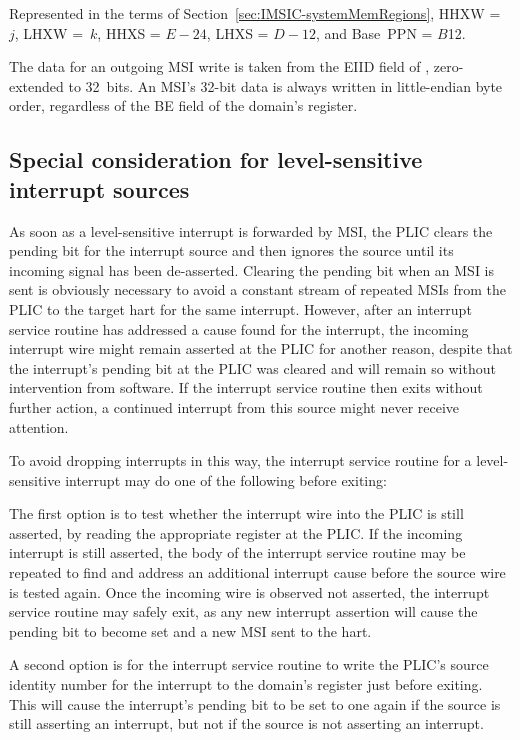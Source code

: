 Represented in the terms of Section~\ref{sec:IMSIC-systemMemRegions},
HHXW =~$j$, LHXW =~$k$, HHXS = ${E-24}$, LHXS = ${D-12}$, and
Base~PPN = $B$\z{>>}12.

The data for an outgoing MSI write is taken from the EIID field of
, zero-extended to 32~bits.
An MSI's \mbox{32-bit} data is always written in little-endian byte
order, regardless of the BE field of the domain's 
register.

\subsection{Special consideration for level-sensitive interrupt sources}

As soon as a level-sensitive interrupt is forwarded by MSI, the PLIC
clears the pending bit for the interrupt source and then ignores the
source until its incoming signal has been de-asserted.
Clearing the pending bit when an MSI is sent is obviously necessary to
avoid a constant stream of repeated MSIs from the PLIC to the target
hart for the same interrupt.
However, after an interrupt service routine has addressed a cause found
for the interrupt, the incoming interrupt wire might remain asserted at
the PLIC for another reason, despite that the interrupt's pending bit
at the PLIC was cleared and will remain so without intervention from
software.
If the interrupt service routine then exits without further action,
a continued interrupt from this source might never receive attention.

To avoid dropping interrupts in this way, the interrupt service routine
for a level-sensitive interrupt may do one of the following before
exiting:

The first option is to test whether the interrupt wire into the PLIC
is still asserted, by reading the appropriate  register at
the PLIC.
If the incoming interrupt is still asserted, the body of the interrupt
service routine may be repeated to find and address an additional
interrupt cause before the source wire is tested again.
Once the incoming wire is observed not asserted, the interrupt service
routine may safely exit, as any new interrupt assertion will cause the
pending bit to become set and a new MSI sent to the hart.

A second option is for the interrupt service routine to write the
PLIC's source identity number for the interrupt to the domain's
 register just before exiting.
This will cause the interrupt's pending bit to be set to one again if
the source is still asserting an interrupt, but not if the source is
not asserting an interrupt.

